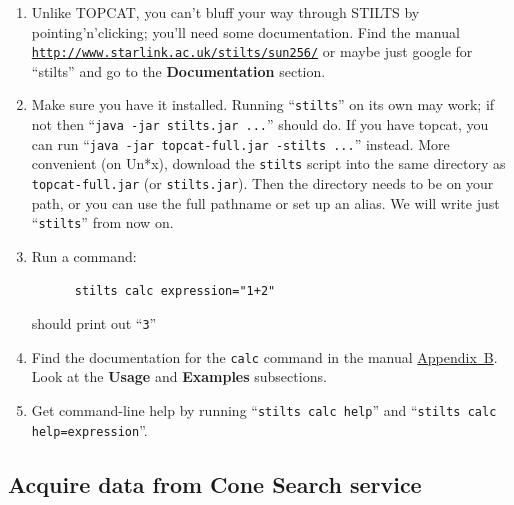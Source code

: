 \documentclass{article}
\newcommand{\lab}[1]{\textbf{#1}}
\newcommand{\burl}[1]{{\color{blue}\texttt{\url{#1}}}}
\newcommand{\bhref}[2]{\href{#1}{{\color{blue}#2}}}
\newcommand{\stiltsmanref}[2]
               {\bhref{http://www.starlink.ac.uk/stilts/sun256/#1.html}{#2}}
\begin{document}
\begin{enumerate}
\item Unlike TOPCAT, you can't bluff your way through STILTS
      by pointing'n'clicking; you'll need some documentation.
      Find the manual \burl{http://www.starlink.ac.uk/stilts/sun256/}
      or maybe just google for ``stilts''
      and go to the \lab{Documentation} section.
\item Make sure you have it installed.
      Running ``{\tt stilts}'' on its own may work; if not then
      ``{\tt java -jar stilts.jar ...}'' should do.
      If you have topcat, you can run
      ``{\tt java -jar topcat-full.jar -stilts ...}'' instead.
      More convenient (on Un*x), download the {\tt stilts} script
      into the same directory as {\tt topcat-full.jar} (or {\tt stilts.jar}).
      Then the directory needs to be on your path, or you can use the
      full pathname or set up an alias.
      We will write just ``{\tt stilts}'' from now on.
\item Run a command:
      \vspace*{-2ex}
      \begin{verbatim}
      stilts calc expression="1+2"
      \end{verbatim}
      \vspace*{-4ex}
      should print out ``{\tt 3}''
\item Find the documentation for the {\tt calc} command in the manual
      \stiltsmanref{calc}{Appendix~B}.
      Look at the \lab{Usage} and \lab{Examples} subsections.
\item Get command-line help by running ``{\tt stilts calc help}'' and
      ``{\tt stilts calc help=expression}''.
\end{enumerate}

\subsection{Acquire data from Cone Search service}
\newcommand{\preverb}{\vspace{-1ex}}
\newcommand{\postverb}{\vspace{-4ex}}
\end{document}
